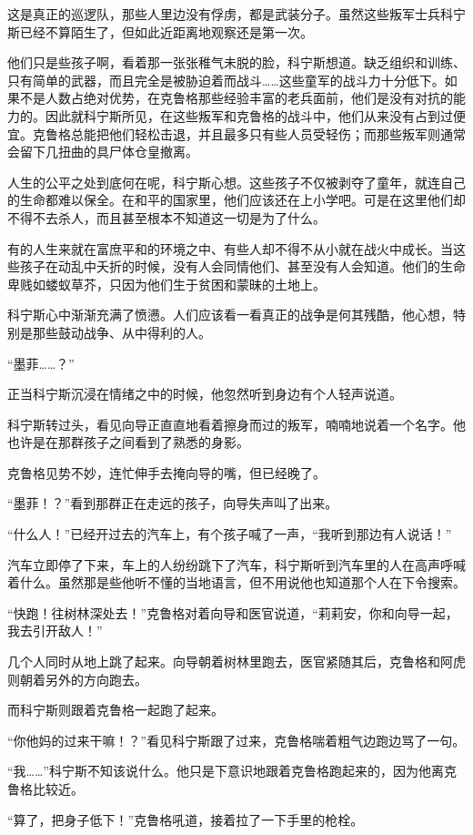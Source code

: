 这是真正的巡逻队，那些人里边没有俘虏，都是武装分子。虽然这些叛军士兵科宁斯已经不算陌生了，但如此近距离地观察还是第一次。

他们只是些孩子啊，看着那一张张稚气未脱的脸，科宁斯想道。缺乏组织和训练、只有简单的武器，而且完全是被胁迫着而战斗……这些童军的战斗力十分低下。如果不是人数占绝对优势，在克鲁格那些经验丰富的老兵面前，他们是没有对抗的能力的。因此就科宁斯所见，在这些叛军和克鲁格的战斗中，他们从来没有占到过便宜。克鲁格总能把他们轻松击退，并且最多只有些人员受轻伤；而那些叛军则通常会留下几扭曲的具尸体仓皇撤离。

人生的公平之处到底何在呢，科宁斯心想。这些孩子不仅被剥夺了童年，就连自己的生命都难以保全。在和平的国家里，他们应该还在上小学吧。可是在这里他们却不得不去杀人，而且甚至根本不知道这一切是为了什么。

有的人生来就在富庶平和的环境之中、有些人却不得不从小就在战火中成长。当这些孩子在动乱中夭折的时候，没有人会同情他们、甚至没有人会知道。他们的生命卑贱如蝼蚁草芥，只因为他们生于贫困和蒙昧的土地上。

科宁斯心中渐渐充满了愤懑。人们应该看一看真正的战争是何其残酷，他心想，特别是那些鼓动战争、从中得利的人。

“墨菲……？”

正当科宁斯沉浸在情绪之中的时候，他忽然听到身边有个人轻声说道。

科宁斯转过头，看见向导正直直地看着擦身而过的叛军，喃喃地说着一个名字。他也许是在那群孩子之间看到了熟悉的身影。

克鲁格见势不妙，连忙伸手去掩向导的嘴，但已经晚了。

“墨菲！？”看到那群正在走远的孩子，向导失声叫了出来。

“什么人！”已经开过去的汽车上，有个孩子喊了一声，“我听到那边有人说话！”

汽车立即停了下来，车上的人纷纷跳下了汽车，科宁斯听到汽车里的人在高声呼喊着什么。虽然那是些他听不懂的当地语言，但不用说他也知道那个人在下令搜索。

“快跑！往树林深处去！”克鲁格对着向导和医官说道，“莉莉安，你和向导一起，我去引开敌人！”

几个人同时从地上跳了起来。向导朝着树林里跑去，医官紧随其后，克鲁格和阿虎则朝着另外的方向跑去。

而科宁斯则跟着克鲁格一起跑了起来。

“你他妈的过来干嘛！？”看见科宁斯跟了过来，克鲁格喘着粗气边跑边骂了一句。

“我……”科宁斯不知该说什么。他只是下意识地跟着克鲁格跑起来的，因为他离克鲁格比较近。

“算了，把身子低下！”克鲁格吼道，接着拉了一下手里的枪栓。

